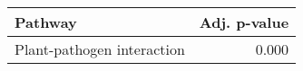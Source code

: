 \begin{tabular}{lr}
\toprule
                    Pathway &  Adj. p-value \\
\midrule
 Plant-pathogen interaction &         0.000 \\
\bottomrule
\end{tabular}
